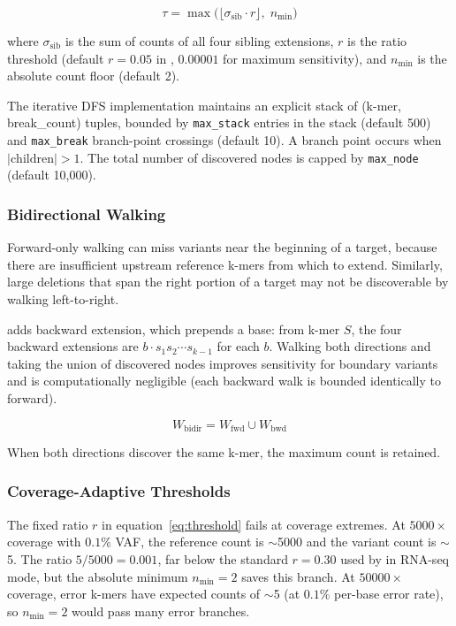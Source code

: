 \begin{equation}
  \tau = \max\!\bigl(\lfloor \sigma_{\text{sib}} \cdot r \rfloor,\; n_{\min}\bigr)
  \label{eq:threshold}
\end{equation}

where $\sigma_{\text{sib}}$ is the sum of counts of all four sibling extensions,
$r$ is the ratio threshold (default $r = 0.05$ in \kmerdet{}, $0.00001$ for
maximum sensitivity), and $n_{\min}$ is the absolute count floor (default 2).

The iterative DFS implementation maintains an explicit stack of (k-mer, break\_count)
tuples, bounded by \texttt{max\_stack} entries in the stack (default 500) and
\texttt{max\_break} branch-point crossings (default 10).  A branch point
occurs when $|\text{children}| > 1$.  The total number of discovered nodes is
capped by \texttt{max\_node} (default 10,000).

\subsubsection{Bidirectional Walking}

Forward-only walking can miss variants near the beginning of a target, because
there are insufficient upstream reference k-mers from which to extend.  Similarly,
large deletions that span the right portion of a target may not be discoverable
by walking left-to-right.

\kmerdet{} adds backward extension, which prepends a base: from k-mer $S$,
the four backward extensions are $b \cdot s_1 s_2 \cdots s_{k-1}$ for each
$b$.  Walking both directions and taking the union of discovered nodes improves
sensitivity for boundary variants and is computationally negligible (each
backward walk is bounded identically to forward).

\begin{equation}
  W_{\text{bidir}} = W_{\text{fwd}} \cup W_{\text{bwd}}
  \label{eq:bidir}
\end{equation}

When both directions discover the same k-mer, the maximum count is retained.

\subsubsection{Coverage-Adaptive Thresholds}
\label{sec:adaptive}

The fixed ratio $r$ in equation~\eqref{eq:threshold} fails at coverage extremes.
At $5000\times$ coverage with $0.1\%$ VAF, the reference count is $\sim$5000
and the variant count is $\sim$5.  The ratio $5/5000 = 0.001$, far below the
standard $r = 0.30$ used by \km{} in RNA-seq mode, but the absolute minimum
$n_{\min} = 2$ saves this branch.  At $50000\times$ coverage, error k-mers
have expected counts of $\sim$5 (at $0.1\%$ per-base error rate), so $n_{\min}
= 2$ would pass many error branches.

